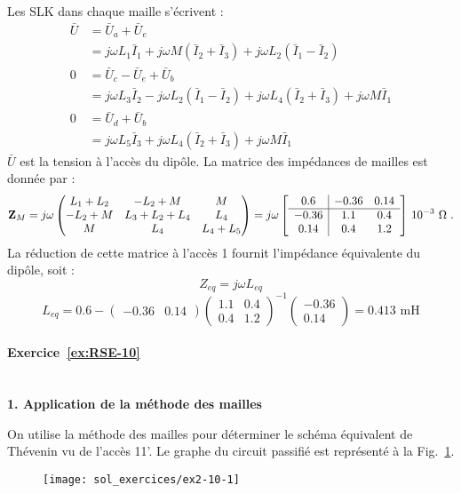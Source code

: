 Les SLK dans chaque maille s'écrivent : 
\begin{align*}
\bar{U}& = \bar{U}_a+\bar{U}_e\\
& =j\omega L_1\bar{I}_1+j\omega M (\bar{I}_2+\bar{I}_3)+j\omega L_2(\bar{I}_1-\bar{I}_2)\\
0& = \bar{U}_c-\bar{U}_e+\bar{U}_b\\
& = j\omega L_3\bar{I}_2-j\omega L_2(\bar{I}_1-\bar{I}_2)+j\omega L_4 (\bar{I}_2+\bar{I}_3)
+j\omega M \bar{I}_1\\
0 & =\bar{U}_d+\bar{U}_b\\
& = j\omega L_5\bar{I}_3+j\omega L_4(\bar{I}_2+\bar{I}_3)+j\omega M \bar{I}_1
\end{align*}
${\bar U}$ est la tension à l'accès du dipôle.
La matrice des impédances de mailles est donnée par :
\[{\bf Z}_M=j\omega 
\begin{pmatrix}
L_1+L_2 & -L_2+M & M\\
-L_2+M & L_3+L_2+L_4 & L_4\\
M & L_4 & L_4+L_5
\end{pmatrix}=
j\omega \left[ \begin{array}{c|cc}
0.6 & -0.36 & 0.14\\ \hline
-0.36 & 1.1 & 0.4 \\
0.14 & 0.4 & 1.2
\end{array}\right]\, 10^{-3}\,\, \Omega ~.\]
La réduction de cette matrice à l'accès 1 fournit l'impédance
équivalente du dipôle, soit :
\[Z_{eq}=j\omega L_{eq}\]
\[L_{eq} =
0.6-
\begin{pmatrix}
-0.36 & 0.14
\end{pmatrix}
\begin{pmatrix}
1.1 & 0.4\\
0.4 & 1.2
\end{pmatrix}^{-1}
\begin{pmatrix}
-0.36\\
0.14
\end{pmatrix}=0.413\text{~mH}\]

\paragraph{Exercice~\ref{ex:RSE-10}}~\\%
{\bf 1. Application de la méthode des mailles}

On utilise la méthode des mailles pour déterminer le schéma équivalent
de Thévenin vu de l'accès 11'. Le graphe du circuit passifié est
représenté à la Fig.~\ref{ex2-10-1s}.
\begin{figure}[h]
	\begin{center}
		\texttt{[image: sol\_exercices/ex2-10-1]}
		\caption{}\label{ex2-10-1s}
	\end{center}
\end{figure}


